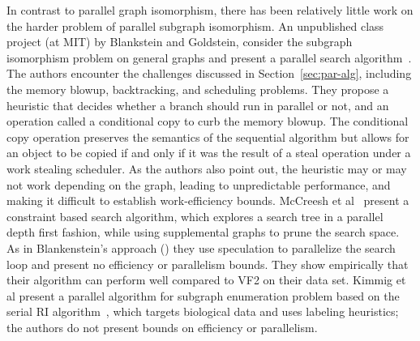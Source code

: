 In contrast to parallel graph isomorphism, there has been relatively
little work on the harder problem of parallel subgraph isomorphism.
%
An unpublished class project (at MIT) by Blankstein and Goldstein,
consider the subgraph isomorphism problem on general graphs and
present a parallel search algorithm~\cite{blankstein}.
%
%
The authors encounter the challenges discussed in
Section~\ref{sec:par-alg}, including the memory blowup, backtracking,
and scheduling problems.
%
They propose a heuristic that decides whether a branch should run in
parallel or not, and an operation called a conditional copy to curb
the memory blowup.
%
The conditional copy operation preserves the semantics of the
sequential algorithm but allows for an object to be copied if and only
if it was the result of a steal operation under a work stealing
scheduler.
%
As the authors also point out, the heuristic may or may not work
depending on the graph, leading to unpredictable performance, and
making it difficult to establish work-efficiency bounds.
%
McCreesh et al~\cite{McCreesh15} present a constraint based search
algorithm, which explores a search tree in a parallel depth first
fashion, while using supplemental graphs to prune the search space. 
%
As in Blankenstein's approach () they use speculation
to parallelize the search loop and present no efficiency or
parallelism bounds. They show empirically that their algorithm can
perform well compared to VF2 on their data set.
%
Kimmig et al present a parallel algorithm for subgraph enumeration
problem based on the serial RI algorithm~\cite{BGP+subgraph-2013},
which targets biological data and uses labeling heuristics;
%
the authors do not present bounds on efficiency or parallelism.



